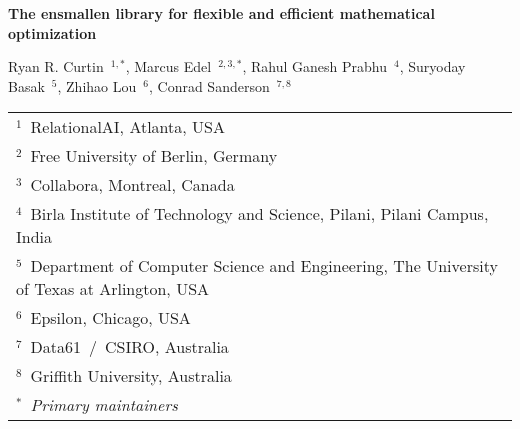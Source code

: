 \documentclass[10pt]{article}
\begin{document}
\pagestyle{empty}

\begin{center}

{\Large\bf The ensmallen library for flexible and efficient mathematical optimization}




\vspace{1.5ex}
Ryan R. Curtin{\tiny~}{$^{1,*}$}, 
Marcus Edel{\tiny~}{$^{2,3,*}$}, 
Rahul Ganesh Prabhu{\tiny~}{$^{4}$}, 
Suryoday Basak{\tiny~}{$^{5}$},
Zhihao Lou{\tiny~}{$^{6}$}, 
Conrad Sanderson{\tiny~}{$^{7,8}$}
\vspace{1.5ex}


\begin{tabular}{l}
$^{1}$~RelationalAI, Atlanta, USA\\
$^{2}$~Free University of Berlin, Germany\\
$^{3}$~Collabora, Montreal, Canada\\
$^{4}$~Birla Institute of Technology and Science, Pilani, Pilani Campus, India\\
$^{5}$~Department of Computer Science and Engineering, The University of Texas at Arlington, USA\\
$^{6}$~Epsilon, Chicago, USA\\
$^{7}$~Data61~/~CSIRO, Australia\\
$^{8}$~Griffith University, Australia\\
$^{*}$~{\it Primary maintainers}
\end{tabular}

\end{center}


\end{document}
